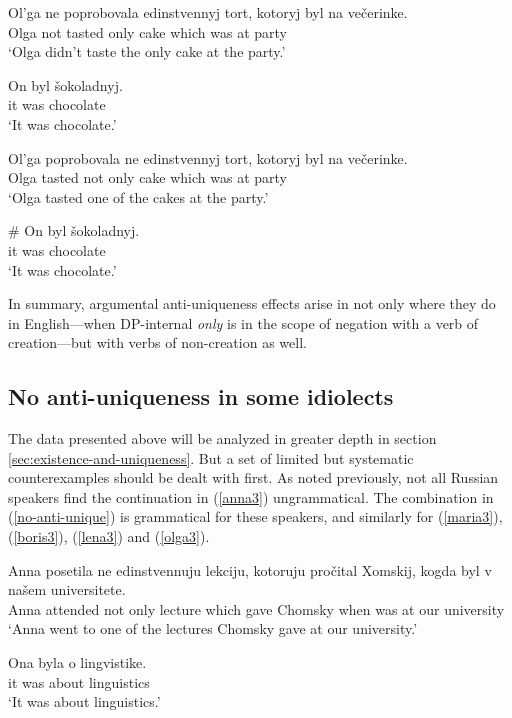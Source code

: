 \begin{exe}
	\ex \begin{xlist}
		\ex \gll Ol'ga ne poprobovala edinstvennyj tort, kotoryj byl na ve\v{c}erinke.\\
		Olga not tasted only cake which was at party\\
		\glt `Olga didn't taste the only cake at the party.'

		\ex \gll On byl \v{s}okoladnyj.\\
		it was chocolate\\
		\glt `It was chocolate.'
	\end{xlist}

	\ex \label{olga3} \begin{xlist}
		\ex \gll Ol'ga poprobovala ne edinstvennyj tort, kotoryj byl na ve\v{c}erinke.\\
		Olga tasted not only cake which was at party\\
		\glt `Olga tasted one of the cakes at the party.'

		\ex \gll \# On byl \v{s}okoladnyj.\\
		{} it was chocolate\\
		\glt `It was chocolate.'
	\end{xlist}
\end{exe}

In summary, argumental anti-uniqueness effects arise in not only where they do in English---when DP-internal \textit{only} is in the scope of negation with a verb of creation---but with verbs of non-creation as well.

\subsection{No anti-uniqueness in some idiolects \label{sec:no-anti-unique}}
The data presented above will be analyzed in greater depth in section \ref{sec:existence-and-uniqueness}. But a set of limited but systematic counterexamples should be dealt with first. As noted previously, not all Russian speakers find the continuation in (\ref{anna3}) ungrammatical. The combination in (\ref{no-anti-unique}) is grammatical for these speakers, and similarly for (\ref{maria3}), (\ref{boris3}), (\ref{lena3}) and (\ref{olga3}).

\begin{exe}
	\ex \label{no-anti-unique} \begin{xlist}
		\ex \gll Anna posetila ne edinstvennuju lekciju, kotoruju pro\v{c}ital Xomskij, kogda byl v na\v{s}em universitete.\\
		Anna attended not only lecture which gave Chomsky when was at our university\\
		\glt `Anna went to one of the lectures Chomsky gave at our university.'

		\ex \gll Ona byla o lingvistike.\\
		it was about linguistics\\
		\glt `It was about linguistics.'
	\end{xlist}
\end{exe}

